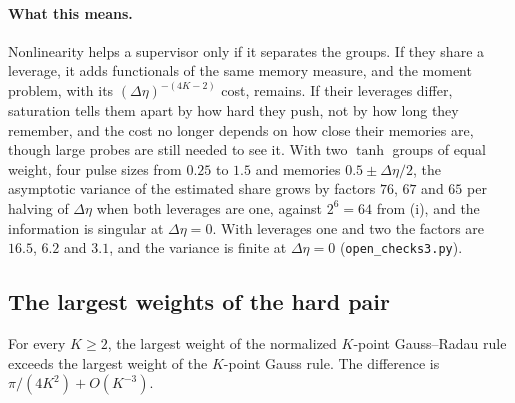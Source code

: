 \paragraph{What this means.} Nonlinearity helps a supervisor only if it separates the groups. If they share a leverage, it adds functionals of the same memory measure, and the moment problem, with its $(\Delta\eta)^{-(4K-2)}$ cost, remains. If their leverages differ, saturation tells them apart by how hard they push, not by how long they remember, and the cost no longer depends on how close their memories are, though large probes are still needed to see it. With two $\tanh$ groups of equal weight, four pulse sizes from $0.25$ to $1.5$ and memories $0.5\pm\Delta\eta/2$, the asymptotic variance of the estimated share grows by factors $76$, $67$ and $65$ per halving of $\Delta\eta$ when both leverages are one, against $2^6=64$ from (i), and the information is singular at $\Delta\eta=0$. With leverages one and two the factors are $16.5$, $6.2$ and $3.1$, and the variance is finite at $\Delta\eta=0$ (\nolinkurl{open_checks3.py}).

\subsection{The largest weights of the hard pair}

\begin{proposition}\label{prop:maxweight}
For every $K\ge2$, the largest weight of the normalized $K$-point Gauss--Radau rule exceeds the largest weight of the $K$-point Gauss rule. The difference is $\pi/(4K^2)+O(K^{-3})$.
\end{proposition}

